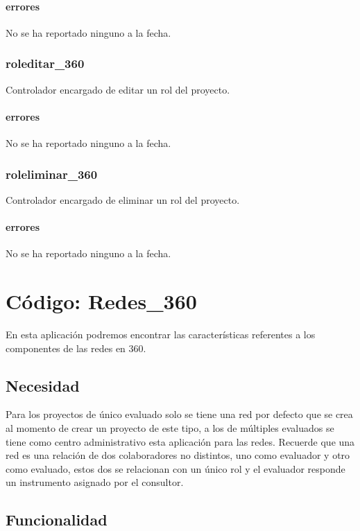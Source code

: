 \documentclass[10pt,a4paper]{book}
\begin{document}
	\subsubsection{errores}
	No se ha reportado ninguno a la fecha.

	\subsection{roleditar\_360}
	Controlador encargado de editar un rol del proyecto.
	\subsubsection{errores}
	No se ha reportado ninguno a la fecha.

	\subsection{roleliminar\_360}
	Controlador encargado de eliminar un rol del proyecto.
	\subsubsection{errores}
	No se ha reportado ninguno a la fecha.


	\chapter{Código: Redes\_360}

	En esta aplicación podremos encontrar las características referentes a los componentes de las redes en 360.

	\section{Necesidad}

	Para los proyectos de único evaluado solo se tiene una red por defecto que se crea al momento de crear un proyecto de este tipo, a los de múltiples evaluados se tiene como centro administrativo esta aplicación para las redes. Recuerde que una red es una relación de dos colaboradores no distintos, uno como evaluador y otro como evaluado, estos dos se relacionan con un único rol y el evaluador responde un instrumento asignado por el consultor.

	\section{Funcionalidad}
\end{document}
